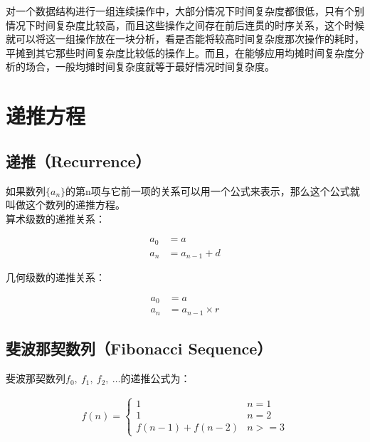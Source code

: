 对一个数据结构进行一组连续操作中，大部分情况下时间复杂度都很低，只有个别情况下时间复杂度比较高，而且这些操作之间存在前后连贯的时序关系，这个时候就可以将这一组操作放在一块分析，看是否能将较高时间复杂度那次操作的耗时，平摊到其它那些时间复杂度比较低的操作上。而且，在能够应用均摊时间复杂度分析的场合，一般均摊时间复杂度就等于最好情况时间复杂度。

\newpage

\section{递推方程}

\subsection{递推（Recurrence）}

如果数列$ \{a_n\} $的第n项与它前一项的关系可以用一个公式来表示，那么这个公式就叫做这个数列的递推方程。\\

算术级数的递推关系：

\vspace{-1cm}

\begin{align*}
	a_0 & = a           \\
	a_n & = a_{n-1} + d
\end{align*}

几何级数的递推关系：

\vspace{-1cm}

\begin{align*}
	a_0 & = a                \\
	a_n & = a_{n-1} \times r
\end{align*}

\vspace{0.5cm}

\subsection{斐波那契数列（Fibonacci Sequence）}

斐波那契数列$ f_0,\ f_1,\ f_2,\ \dots $的递推公式为：

\vspace{-0.5cm}

\begin{align*}
	f(n) = \begin{cases}
		1               & n = 1  \\
		1               & n = 2  \\
		f(n-1) + f(n-2) & n >= 3
	\end{cases}
\end{align*}

